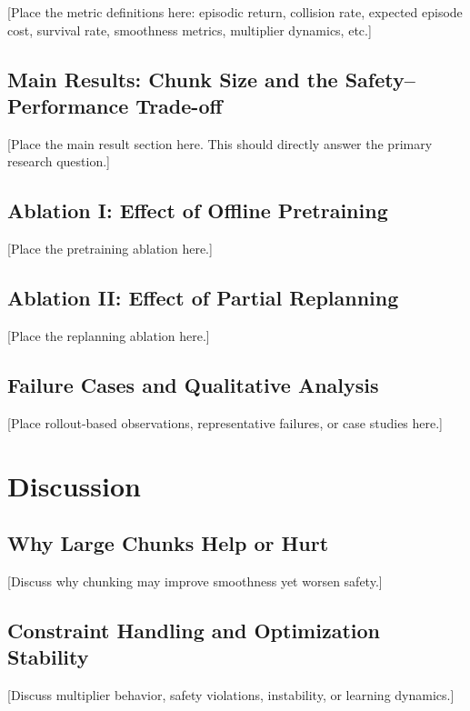 \documentclass{article}
\begin{document}
[Place the metric definitions here: episodic return, collision rate, expected episode cost, survival rate, smoothness metrics, multiplier dynamics, etc.]

\subsection{Main Results: Chunk Size and the Safety--Performance Trade-off}

[Place the main result section here. This should directly answer the primary research question.]

\subsection{Ablation I: Effect of Offline Pretraining}

[Place the pretraining ablation here.]

\subsection{Ablation II: Effect of Partial Replanning}

[Place the replanning ablation here.]

\subsection{Failure Cases and Qualitative Analysis}

[Place rollout-based observations, representative failures, or case studies here.]

\section{Discussion}

\subsection{Why Large Chunks Help or Hurt}

[Discuss why chunking may improve smoothness yet worsen safety.]

\subsection{Constraint Handling and Optimization Stability}

[Discuss multiplier behavior, safety violations, instability, or learning dynamics.]
\end{document}
